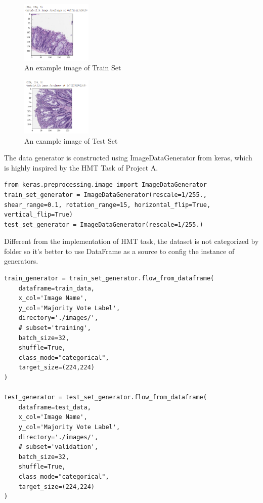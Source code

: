 \documentclass[conference]{IEEEtran}
\begin{document}
\begin{figure}[h] 
    \centering
    \includegraphics[width=0.3\textwidth]{./graphs/Task2/traindata-image.png}
    \caption{An example image of Train Set}
    \label{sp-train}
\end{figure}

\begin{figure}[h] 
    \centering
    \includegraphics[width=0.3\textwidth]{./graphs/Task2/testdata-image.png}
    \caption{An example image of Test Set}
    \label{sp-test}
\end{figure}

The data generator is constructed using ImageDataGenerator from keras, which is highly inspired by the HMT Task of Project A.
\begin{lstlisting}
from keras.preprocessing.image import ImageDataGenerator
train_set_generator = ImageDataGenerator(rescale=1/255., shear_range=0.1, rotation_range=15, horizontal_flip=True, vertical_flip=True)
test_set_generator = ImageDataGenerator(rescale=1/255.)
\end{lstlisting}

Different from the implementation of HMT task, the dataset is not categorized by folder so it's better to use DataFrame as a source to config the instance of generators.

\begin{lstlisting}
train_generator = train_set_generator.flow_from_dataframe(
    dataframe=train_data,
    x_col='Image Name',
    y_col='Majority Vote Label',
    directory='./images/',
    # subset='training',
    batch_size=32,
    shuffle=True,
    class_mode="categorical",
    target_size=(224,224)
)

test_generator = test_set_generator.flow_from_dataframe(
    dataframe=test_data,
    x_col='Image Name',
    y_col='Majority Vote Label',
    directory='./images/',
    # subset='validation',
    batch_size=32,
    shuffle=True,
    class_mode="categorical",
    target_size=(224,224)
)
\end{lstlisting}
\end{document}
